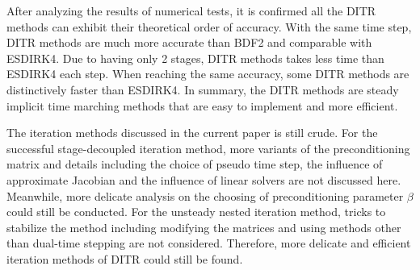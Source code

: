 \documentclass[preprint,12pt]{elsarticle}
\begin{document}
After analyzing the results of numerical tests, it is confirmed 
all the DITR methods can exhibit their theoretical order of accuracy.
With the same time step, DITR methods are much more accurate than 
BDF2 and comparable with ESDIRK4. 
Due to having only 2 stages, DITR methods takes less time than ESDIRK4
each step.
When reaching the same accuracy, some DITR methods are 
distinctively faster than ESDIRK4. 
In summary, the DITR methods are steady implicit time marching methods 
that are easy to implement and more efficient.

The iteration methods discussed in the current paper is still crude.
For the successful stage-decoupled iteration method,
more variants of the preconditioning matrix and details including 
the choice of pseudo time step, the influence of approximate
Jacobian and the influence of linear solvers are not discussed here.
Meanwhile, more delicate analysis on the choosing of preconditioning parameter 
$\beta$ could still be conducted. 
For the unsteady nested iteration method, 
tricks to stabilize the method including modifying the matrices and 
using methods other than dual-time stepping are not considered. 
Therefore, more delicate and efficient iteration methods of DITR could 
still be found.












\end{document}
